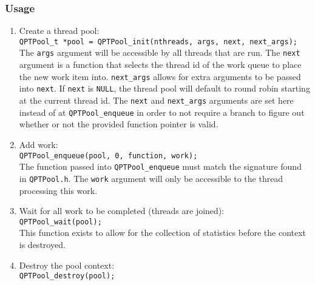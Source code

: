 \subsubsection{Usage}
\begin{enumerate}
\item Create a thread pool: \\ \texttt{QPTPool\_t *pool =
  QPTPool\_init(nthreads, args, next, next\_args);} \\ The
  \texttt{args} argument will be accessible by all threads that are
  run. The \texttt{next} argument is a function that selects the
  thread id of the work queue to place the new work item
  into. \texttt{next\_args} allows for extra arguments to be passed
  into \texttt{next}. If \texttt{next} is \texttt{NULL}, the thread
  pool will default to round robin starting at the current thread
  id. The \texttt{next} and \texttt{next\_args} arguments are set here
  instead of at \texttt{QPTPool\_enqueue} in order to not require a
  branch to figure out whether or not the provided function pointer is
  valid.
\item Add work: \\ \texttt{QPTPool\_enqueue(pool, 0, function,
  work);} \\ The function passed into \texttt{QPTPool\_enqueue} must
  match the signature found in \texttt{QPTPool.h}. The \texttt{work}
  argument will only be accessible to the thread processing this work.
\item Wait for all work to be completed (threads are joined):
  \\ \texttt{QPTPool\_wait(pool);} \\ This function exists to allow
  for the collection of statistics before the context is destroyed.
\item Destroy the pool context: \\ \texttt{QPTPool\_destroy(pool);}
\end{enumerate}
